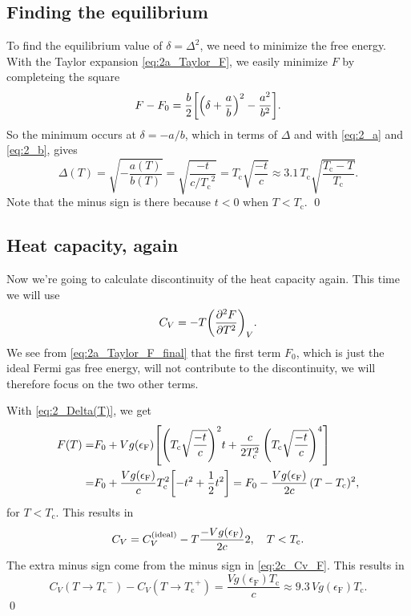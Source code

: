 \documentclass[11pt,letter, swedish, english
]{article}
\newcommand{\Tc}{\ensuremath{T_{\text{c}}}}
\newcommand{\eF}{\ensuremath{\epsilon_{\text{F}}}}
\begin{document}
\subsection{Finding the equilibrium}
To find the equilibrium value of $\delta=\Delta^2$, we need to minimize
the free energy. With the Taylor expansion \eqref{eq:2a_Taylor_F}, we
easily minimize $F$ by completeing the square
\begin{equation}\label{eq:2b_F_compl_sq}
F-F_0=\frac{b}{2}\qty[\qty(\delta+\frac{a}{b})^2-\frac{a^2}{b^2}].
\end{equation}
So the minimum occurs at $\delta=-a/b$, which in terms of $\Delta$ and
with \eqref{eq:2_a} and \eqref{eq:2_b}, gives
\begin{equation}\label{eq:2_Delta(T)}
\Delta(T)=\sqrt{-\frac{a(T)}{b(T)}}
=\sqrt{\frac{-t}{c/\Tc^2}}
=\Tc\sqrt{\frac{-t}{c}}\approx3.1\,\Tc\sqrt{\frac{\Tc-T}{\Tc}}.
\end{equation}
Note that the minus sign is there because $t<0$ when $T<\Tc$.
\qed

\subsection{Heat capacity, again}
Now we're going to calculate discontinuity of the heat capacity
again. This time we will use
\begin{equation}\label{eq:2c_Cv_F}
C_V=-T\qty(\pdv[2]{F}{T})_V.
\end{equation}
We see from \eqref{eq:2a_Taylor_F_final} that the first term $F_0$,
which is just the ideal Fermi gas free energy, will not contribute to
the discontinuity, we will therefore focus on the two other terms. 

With \eqref{eq:2_Delta(T)}, we get
\begin{equation}
\begin{aligned}
F(T)=&F_0+Vg(\eF)\qty[
\qty(\Tc\sqrt{\frac{-t}{c}})^2 t+
\frac{c}{2\Tc^2}\,
\qty(\Tc\sqrt{\frac{-t}{c}})^4
]\\
=&F_0+\frac{Vg(\eF)}{c}\Tc^2\qty[
-t^2+\frac{1}{2}t^2 ]
=F_0-\frac{Vg(\eF)}{2c}\,(T-\Tc)^2,
\end{aligned}
\end{equation}
for $T<\Tc$.
This results in
\begin{equation}
C_V=C_V^{\text{(ideal)}} - T\frac{-Vg(\eF)}{2c}2
\qcomma
T<\Tc.
\end{equation}
The extra minus sign come from the minus sign in \eqref{eq:2c_Cv_F}.
This results in
\begin{equation}
C_V(T\to\Tc^-)-C_V(T\to\Tc^+)=\frac{Vg(\eF)\Tc}{c}
\approx 9.3\,Vg(\eF)\Tc.
\end{equation}
\qed
\end{document}
